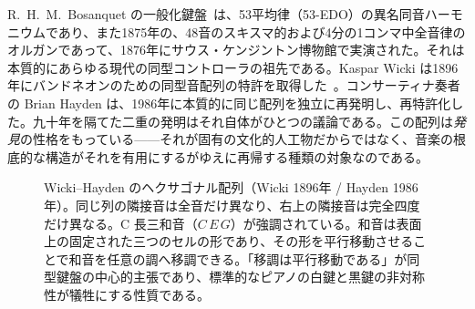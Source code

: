 \documentclass[10pt,letterpaper,twocolumn]{article}
\begin{document}
R.\ H.\ M.\ Bosanquet の一般化鍵盤~\citep{bosanquet1875generalized}は、53平均律（53-EDO）の異名同音ハーモニウムであり、また1875年の、48音のスキスマ的および4分の1コンマ中全音律のオルガンであって、1876年にサウス・ケンジントン博物館で実演された。それは本質的にあらゆる現代の同型コントローラの祖先である。Kaspar Wicki は1896年にバンドネオンのための同型音配列の特許を取得した~\citep{wicki1896}。コンサーティナ奏者の Brian Hayden は、1986年に本質的に同じ配列を独立に再発明し、再特許化した。九十年を隔てた二重の発明はそれ自体がひとつの議論である。この配列は\emph{発見}の性格をもっている——それが固有の文化的人工物だからではなく、音楽の根底的な構造がそれを有用にするがゆえに再帰する種類の対象なのである。

\begin{figure}[t]
\centering
{}
\caption{Wicki--Hayden のヘクサゴナル配列（Wicki 1896年 / Hayden 1986年）。同じ列の隣接音は全音だけ異なり、右上の隣接音は完全四度だけ異なる。C 長三和音（$C\,E\,G$）が強調されている。和音は表面上の固定された三つのセルの形であり、その形を平行移動させることで和音を任意の調へ移調できる。「移調は平行移動である」が同型鍵盤の中心的主張であり、標準的なピアノの白鍵と黒鍵の非対称性が犠牲にする性質である。}
\label{fig:wicki}
\end{figure}
\end{document}
